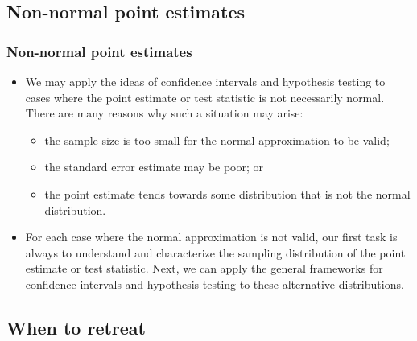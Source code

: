 
\subsection{Non-normal point estimates}


\begin{frame}
\frametitle{Non-normal point estimates}

\begin{itemize}

\item We may apply the ideas of confidence intervals and hypothesis testing to cases where the point estimate or test statistic is not necessarily normal. There are many reasons why such a situation may arise:
\begin{itemize}
\item the sample size is too small for the normal approximation to be valid;
\item the standard error estimate may be poor; or
\item the point estimate tends towards some distribution that is not the normal distribution.
\end{itemize}

\item For each case where the normal approximation is not valid, our first task is always to understand and characterize the sampling distribution of the point estimate or test statistic. Next, we can apply the general frameworks for confidence intervals and hypothesis testing to these alternative distributions.

\end{itemize}

\end{frame}


\subsection{When to retreat}


